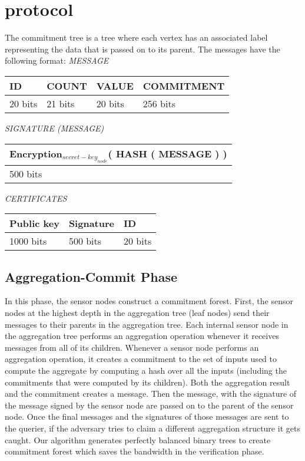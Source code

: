 \chapter{protocol}
	
	The commitment tree is a tree where each vertex has an associated label representing the data that is passed on to its parent. The messages have the following format: 
	\textit{MESSAGE}
	\newline
	
	\begin{tabular}{ | l | l | l | l |}
		\hline
		ID & COUNT & VALUE & COMMITMENT \\
		\hline
		20 bits & 21 bits & 20 bits & 256 bits\\
		\hline
	\end{tabular}
	\newline
	\newline
	\textit{SIGNATURE (MESSAGE)}
	\newline

	\begin{tabular}{ |l| }
		\hline
		Encryption$_{secret-key_{node}}$( HASH ( MESSAGE ) )\\
		\hline
		500 bits\\
		\hline
	\end{tabular}
	\newline
	\newline
	\textit{CERTIFICATES}
	\newline

	\begin{tabular}{ | l | l | l | }
		\hline
			Public key  & Signature & ID \\
		\hline
			1000 bits & 500 bits & 20 bits \\
		\hline

	\end{tabular}

	\newpage

\section{Aggregation-Commit Phase}
	In this phase, the sensor nodes construct a commitment forest. 
	First, the sensor nodes at the highest depth in the aggregation tree (leaf nodes) send their messages to their parents in the aggregation tree.
	Each internal sensor node in the aggregation tree performs an aggregation operation whenever it receives messages from all of its children.
	Whenever a sensor node performs an aggregation operation, it creates a commitment to the set of inputs used to compute the aggregate by computing a hash over all the inputs (including the commitments that were computed by its children). 
	Both the aggregation result and the commitment creates a message.
	Then the message, with the signature of the message signed by the sensor node are passed on to the parent of the sensor node.
	Once the final messages and the signatures of those messages are sent to the querier, if the adversary tries to claim a different aggregation structure it gets caught.
	Our algorithm generates perfectly balanced binary trees to create commitment forest which saves the bandwidth in the verification phase.


